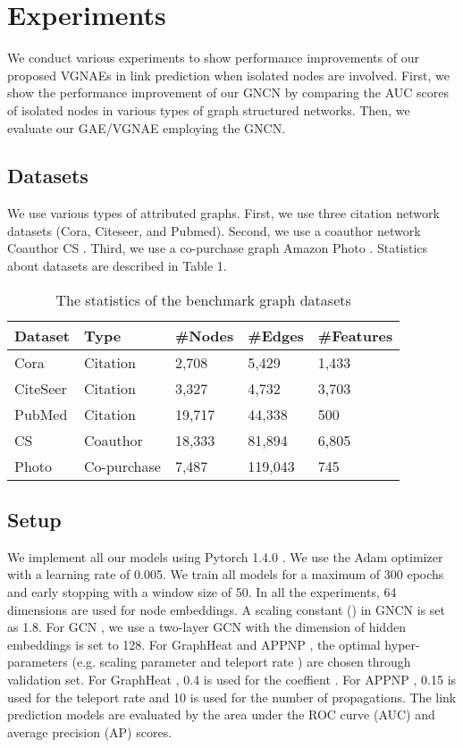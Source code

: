 \documentclass[sigconf]{acmart}
\begin{document}
\section{Experiments}
We conduct various experiments to show performance improvements of our proposed VGNAEs in link prediction when isolated nodes are involved.
First, we show the performance improvement of our GNCN by comparing the AUC scores of isolated nodes in various types of graph structured networks.
Then, we evaluate our GAE/VGNAE employing the GNCN.


\subsection{Datasets}
We use various types of attributed graphs.
First, we use three citation network datasets (Cora, Citeseer, and Pubmed).
Second, we use a coauthor network Coauthor CS \cite{shchur2018pitfalls}.
Third, we use a co-purchase graph Amazon Photo \cite{shchur2018pitfalls}.
Statistics about datasets are described in Table 1.
\begin{table}
  \caption{The statistics of the benchmark graph datasets}
  \label{sample-table}
  \centering
  \begin{tabular}{lllll}
    \toprule
    Dataset & Type  &  {\#}Nodes     & {\#}Edges  & {\#}Features \\
    \midrule
    \midrule
    Cora    & Citation  & 2,708  &  5,429  &  1,433     \\
    CiteSeer & Citation & 3,327   &  4,732  &  3,703    \\
    PubMed & Citation & 19,717  &  44,338 &  500 \\
    CS & Coauthor & 18,333 & 81,894 & 6,805 \\
    Photo & Co-purchase & 7,487 & 119,043 & 745 \\
    \bottomrule
  \end{tabular}
\end{table}

\subsection{Setup}
We implement all our models using Pytorch 1.4.0 \cite{paszke2019pytorch}.
We use the Adam optimizer \cite{kingma2014adam} with a learning rate of 0.005.
We train all models for a maximum of 300 epochs and early stopping with a window size of 50.
In all the experiments, 64 dimensions are used for node embeddings.
A scaling constant () in GNCN is set as 1.8.
For GCN \cite{kipf2016semi}, we use a two-layer GCN with the dimension of hidden embeddings is set to 128.
For GraphHeat \cite{xu2020graph} and APPNP \cite{klicpera2018predict}, the optimal hyper-parameters (e.g. scaling parameter  and teleport rate ) are chosen through validation set.
For GraphHeat \cite{xu2020graph}, 0.4 is used for the coeffient .
For APPNP \cite{klicpera2018predict}, 0.15 is used for the teleport rate and 10 is used for the number of propagations.
The link prediction models are evaluated by the area under the ROC curve (AUC) and average precision (AP) scores. 
\end{document}
